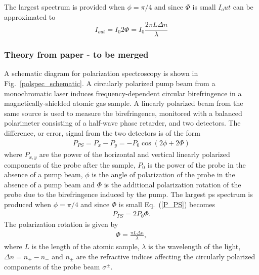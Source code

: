 The largest spectrum is provided when $\phi=\pi/4$ and since $\Phi$ is small $I_out$ can be approximated to
\begin{equation}
I_{out} = I_0 2\Phi = I_0 \frac{2\pi L \Delta n}{\lambda}
\end{equation}

\subsubsection{Theory from paper - to be merged}
A schematic diagram for polarization spectroscopy is shown in Fig.~\ref{polspec_schematic}. A circularly polarized pump beam from a monochromatic laser induces frequency-dependent circular birefringence in a magnetically-shielded atomic gas sample. A linearly polarized beam from the same source is used to measure the birefringence, monitored with a balanced polarimeter consisting of a half-wave phase retarder,  and two detectors. The difference, or error, signal from the two detectors is of the form \cite{pearman_polarization_2002}
\begin{align}
P_{PS} = P_x-P_y = -P_0 \cos(2\phi+2\Phi)\label{P_PS}
\end{align}
where $P_{x,y}$ are the power of the horizontal and vertical linearly polarized components of the probe after the sample, $P_0$ is the power of the probe in the absence of a pump beam, $\phi$ is the angle of polarization of the probe in the absence of a pump beam and $\Phi$ is the additional polarization rotation of the probe due to the birefringence induced by the pump. The largest \gls*{ps} spectrum is produced when $\phi=\pi/4$ and since $\Phi$ is small Eq.~(\ref{P_PS})  becomes
\begin{align}
P_{PS} = 2P_0 \Phi.
\end{align}
The polarization rotation is given by
\begin{align}
\Phi = \frac{\pi L \Delta n}{\lambda},
\end{align}
where $L$ is the length of the atomic sample, $\lambda$ is the wavelength of the light, $\Delta n = n_+ - n_-$ and $n_\pm$ are the refractive indices affecting the circularly polarized components of the probe beam $\sigma^\pm$.
